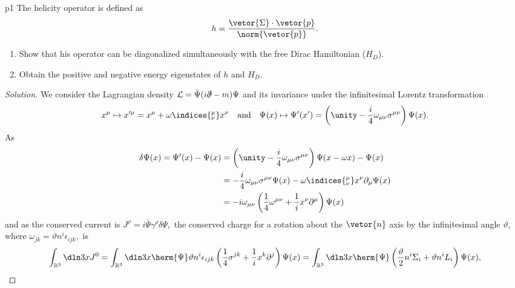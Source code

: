 \begin{problem}{}{p1}
   The helicity operator is defined as
   \begin{equation*}
      h = \frac{\vetor{\Sigma}\cdot \vetor{p}}{\norm{\vetor{p}}}.
   \end{equation*}
   \begin{enumerate}[label=(\alph*)]
       \item Show that his operator can be diagonalized simultaneously with the free Dirac Hamiltonian (\(H_D\)).
       \item Obtain the positive and negative energy eigenstates of \(h\) and \(H_D\).
   \end{enumerate}
\end{problem}
\begin{proof}[Solution]
   We consider the Lagrangian density \(\mathcal{L} = \bar{\Psi} (i \slashed{\partial} - m) \Psi\) and its invariance under the infinitesimal Lorentz transformation 
   \begin{equation*}
      x^\mu \mapsto x'^\mu = x^\mu + \omega\indices{^\mu_\nu}x^\nu\quad\text{and}\quad\Psi(x) \mapsto \Psi'(x') = \left(\unity - \frac{i}{4} \omega_{\mu\nu} \sigma^{\mu\nu}\right)\Psi(x).
   \end{equation*}
   As
   \begin{align*}
      \delta \Psi(x) = \Psi'(x) - \Psi(x) &= \left(\unity - \frac{i}{4} \omega_{\mu\nu} \sigma^{\mu\nu}\right)\Psi(x - \omega x) - \Psi(x)\\
                                          &= -\frac{i}{4} \omega_{\mu\nu} \sigma^{\mu\nu}\Psi(x) - \omega\indices{^\mu_\nu} x^\nu\partial_\mu \Psi(x)\\
                                          &= -i \omega_{\mu\nu} \left(\frac14 \omega^{\mu\nu} + \frac1i x^\nu \partial^\mu\right)\Psi(x)
   \end{align*}
   and as the conserved current is \(J^\rho = i \bar{\Psi} \gamma^\rho \delta \Psi,\) the conserved charge for a rotation about the \(\vetor{n}\) axis by the infinitesimal angle \(\vartheta\), where \(\omega_{jk} = \vartheta n^i \epsilon_{ijk},\) is
   \begin{equation*}
      \int_{\mathbb{R}^3} \dln3x J^0 = \int_{\mathbb{R}^3} \dln3x \herm{\Psi} \vartheta n^i \epsilon_{ijk} \left(\frac14 \sigma^{jk} + \frac{1}{i} x^{k} \partial^j\right) \Psi(x) = \int_{\mathbb{R}^3} \dln3x \herm{\Psi} \left(\frac{\vartheta}2 n^i \Sigma_i + \vartheta n^i L_i\right)\Psi(x),
   \end{equation*}

\end{proof}
